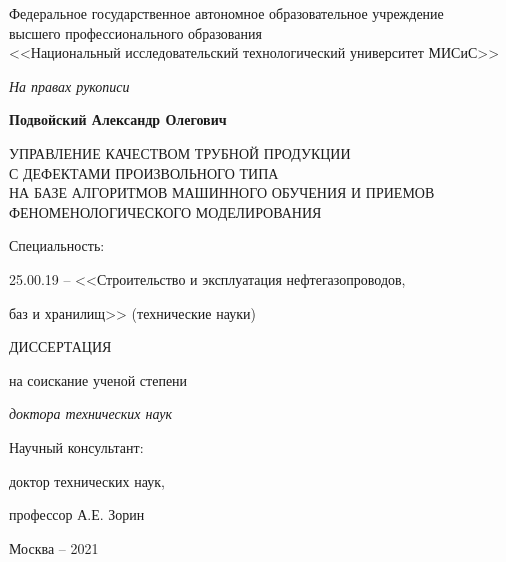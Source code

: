 \thispagestyle{empty}%
	\begin{center}
		Федеральное государственное автономное образовательное учреждение\\

		высшего профессионального образования\\

		<<Национальный исследовательский технологический университет МИСиС>>
	\end{center}
	\vspace{\baselineskip}\vspace{-5mm}

	\begin{flushright}
		\itshape
		На правах рукописи
	\end{flushright}
	\vspace{\baselineskip}\vspace{-5mm}
	
	\begin{center}
		\textbf{Подвойский Александр Олегович}
	\end{center}
	\vspace{5mm}
	
	\begin{center}
		\bfseries
		\begin{spacing}{1.3}
			УПРАВЛЕНИЕ КАЧЕСТВОМ ТРУБНОЙ ПРОДУКЦИИ\\

			С ДЕФЕКТАМИ ПРОИЗВОЛЬНОГО ТИПА\\

			НА БАЗЕ АЛГОРИТМОВ МАШИННОГО ОБУЧЕНИЯ И ПРИЕМОВ ФЕНОМЕНОЛОГИЧЕСКОГО МОДЕЛИРОВАНИЯ
		\end{spacing}
	\end{center}
	\vspace{\baselineskip}\vspace{-16mm}
	
	\begin{center}
		Специальность:
		
		25.00.19 -- <<Строительство и эксплуатация нефтегазопроводов,
		
		баз и хранилищ>> (технические науки)
	\end{center}
	\vspace{\baselineskip}\vspace{-8mm}

	\begin{center}
		ДИССЕРТАЦИЯ
		
		на соискание ученой степени
		
		\emph{доктора технических наук}
	\end{center}
	\vspace{\baselineskip}\vspace{5mm}

	\begin{flushright}
		Научный консультант:
		
		доктор технических наук,
		
		профессор А.Е. Зорин
	\end{flushright}

	\vfill
	\begin{center}
		Москва -- 2021
	\end{center}
\newpage
